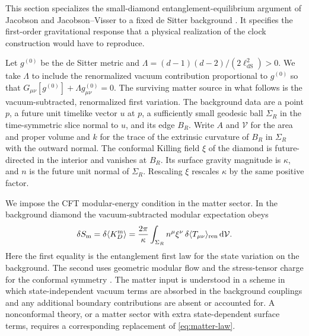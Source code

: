 \documentclass[11pt,a4paper]{article}
\numberwithin{equation}{section}
\theoremstyle{remark}
\newcommand{\dd}{\mathrm d}
\newcommand{\Smat}{S_{\mathrm{m}}}
\newcommand{\lDS}{\ell_{\mathrm{dS}}}
\newcommand{\Vol}{\mathcal V}
\begin{document}
This section specializes the small-diamond entanglement-equilibrium argument of Jacobson and Jacobson--Visser to a fixed de Sitter background \cite{Jacobson2016,JacobsonVisser2019}. It specifies the first-order gravitational response that a physical realization of the clock construction would have to reproduce.

Let $g^{(0)}$ be the de Sitter metric and $\Lambda=(d-1)(d-2)/(2\lDS^2)>0$. We take $\Lambda$ to include the renormalized vacuum contribution proportional to $g^{(0)}$ so that $G_{\mu\nu}[g^{(0)}]+\Lambda g^{(0)}_{\mu\nu}=0$. The surviving matter source in what follows is the vacuum-subtracted, renormalized first variation. The background data are a point $p$, a future unit timelike vector $u$ at $p$, a sufficiently small geodesic ball $\Sigma_R$ in the time-symmetric slice normal to $u$, and its edge $B_R$. Write $A$ and $\Vol$ for the area and proper volume and $k$ for the trace of the extrinsic curvature of $B_R$ in $\Sigma_R$ with the outward normal. The conformal Killing field $\xi$ of the diamond is future-directed in the interior and vanishes at $B_R$. Its surface gravity magnitude is $\kappa$, and $n$ is the future unit normal of $\Sigma_R$. Rescaling $\xi$ rescales $\kappa$ by the same positive factor.

We impose the CFT modular-energy condition in the matter sector. In the background diamond the vacuum-subtracted modular expectation obeys
\begin{equation}
 \delta\Smat=\delta\langle K_D^{\rm m}\rangle
 =\frac{2\pi}{\kappa}\int_{\Sigma_R}
          n^\mu\xi^\nu\,\delta\langle T_{\mu\nu}\rangle_{\rm ren}\,\dd\Vol.
 \label{eq:matter-law}
\end{equation}
Here the first equality is the entanglement first law for the state variation on the background. The second uses geometric modular flow and the stress-tensor charge for the conformal symmetry \cite{Brunetti1993,Jacobson2016,JacobsonVisser2019}. The matter input is understood in a scheme in which state-independent vacuum terms are absorbed in the background couplings and any additional boundary contributions are absent or accounted for. A nonconformal theory, or a matter sector with extra state-dependent surface terms, requires a corresponding replacement of \eqref{eq:matter-law}.
\end{document}
